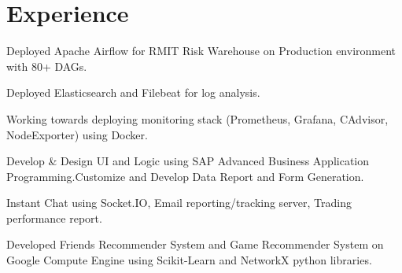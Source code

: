 \documentclass[]{Vishnu-Resume}
\begin{document}
\hfill
\begin{minipage}[t]{0.66\textwidth} 


\section{Experience}

\vspace{\topsep} %
\begin{tightemize}\item Deployed Apache Airflow for RMIT Risk Warehouse on Production environment with 80+ DAGs.
\item Deployed Elasticsearch and Filebeat for log analysis.
\item Working towards deploying monitoring stack (Prometheus, Grafana, CAdvisor, NodeExporter) using Docker.
\end{tightemize}
\sectionsep

\begin{tightemize}\item Develop & Design UI and Logic using SAP Advanced Business Application
Programming.Customize and Develop Data Report and Form Generation.
\end{tightemize}
\sectionsep

\begin{tightemize}\item Instant Chat using Socket.IO, Email reporting/tracking server, Trading performance report.
\end{tightemize}
\sectionsep

\begin{tightemize}\item Developed Friends Recommender System and Game Recommender System on
Google Compute Engine using Scikit-Learn and NetworkX python libraries.
\end{tightemize}
\sectionsep


\end{minipage}
\end{document}
